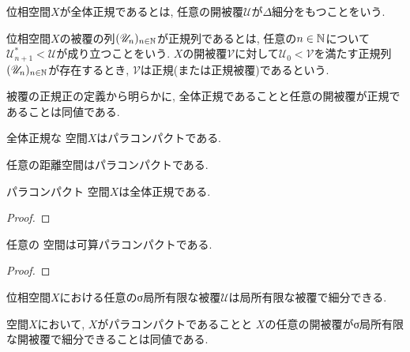 \documentclass[uplatex, dvipdfmx, a4paper, 12pt, class=jsbook, crop=false]{standalone}
\begin{document}
\begin{definition}
	位相空間$ X $が全体正規であるとは, 任意の開被覆$ \mathscr{U} $が$ \Delta $細分をもつことをいう.
\end{definition}

\begin{definition}
	位相空間$ X $の被覆の列$ (\mathscr{U}_n)_{n \in \mathbb{N}} $が正規列であるとは,
	任意の$ n \in \mathbb{N}  $について$ \mathscr{U}_{n+1}^* < \mathscr{U} $が成り立つことをいう.
	$ X $の開被覆$ \mathscr{V} $に対して$ \mathscr{U}_0 < \mathscr{V} $を満たす正規列
	$ (\mathscr{U}_n)_{n \in \mathbb{N}} $が存在するとき,
	$ \mathscr{V} $は正規(または正規被覆)であるという.
\end{definition}

被覆の正規正の定義から明らかに, 全体正規であることと任意の開被覆が正規であることは同値である.

\begin{theorem}
	全体正規な  空間$ X $はパラコンパクトである.
\end{theorem}

\begin{theorem}
	任意の距離空間はパラコンパクトである.
\end{theorem}

\begin{theorem}
	パラコンパクト  空間$ X $は全体正規である.
\end{theorem}

\begin{proof}
	\WIP
\end{proof}

\begin{proposition}
	任意の  空間は可算パラコンパクトである.
\end{proposition}
\begin{proof}
	\WIP
\end{proof}

\begin{proposition}
	位相空間$ X $における任意のσ局所有限な被覆$ \mathscr{U} $は局所有限な被覆で細分できる.
\end{proposition}

\begin{proposition}
	 空間$ X $において, $ X $がパラコンパクトであることと
	$ X $の任意の開被覆がσ局所有限な開被覆で細分できることは同値である.
\end{proposition}
\end{document}
